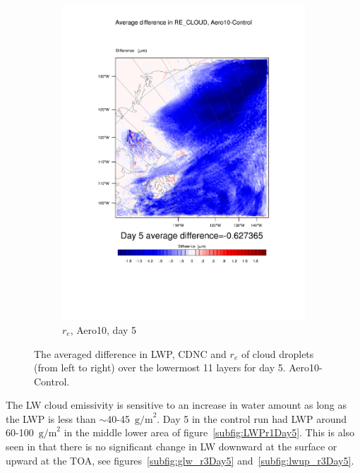 \begin{figure}[hb]
\begin{subfigure}{0.30\textwidth}
		\includegraphics[width=\textwidth]{results/aero10/diff_Aero10_RE_CLOUD_Day5.pdf}
		\caption{$r_e$, Aero10, day 5}
		\label{subfig:recloud_r3Day5}
	\end{subfigure}
	\caption{The averaged difference in LWP, CDNC and $r_e$ of cloud droplets (from left to right) over the lowermost 11 layers for day 5. Aero10-Control.}
	\label{fig:lwpcdncre_r3Day5}
\end{figure}

The LW cloud emissivity is sensitive to an increase in water amount as long as the LWP is less than $\sim$40-45~$\text{g/m}^2$. Day 5 in the control run had LWP around 60-100~$\text{g/m}^2$ in the middle lower area of figure~\ref{subfig:LWPr1Day5}. %
This is also seen in that there is no significant change in LW downward at the surface or upward at the TOA, see figures~\ref{subfig:glw_r3Day5} and~\ref{subfig:lwup_r3Day5}.

